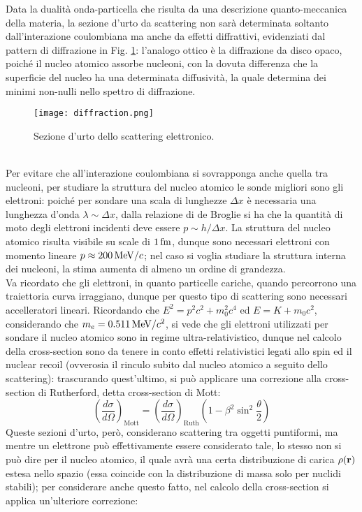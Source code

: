 Data la dualità onda-particella che risulta da una descrizione quanto-meccanica della materia, la sezione d'urto da scattering non sarà determinata soltanto dall'interazione coulombiana ma anche da effetti diffrattivi, evidenziati dal pattern di diffrazione in Fig. \ref{diffraction}: l'analogo ottico è la diffrazione da disco opaco, poiché il nucleo atomico assorbe nucleoni, con la dovuta differenza che la superficie del nucleo ha una determinata diffusività, la quale determina dei minimi non-nulli nello spettro di diffrazione.
\begin{figure}
	\centering
	\texttt{[image: diffraction.png]}
	\caption{Sezione d'urto dello scattering elettronico.}
	\label{diffraction}
\end{figure}\\
Per evitare che all'interazione coulombiana si sovrapponga anche quella tra nucleoni, per studiare la struttura del nucleo atomico le sonde migliori sono gli elettroni: poiché per sondare una scala di lunghezze $ \Delta x $ è necessaria una lunghezza d'onda $ \lambda \sim \Delta x $, dalla relazione di de Broglie si ha che la quantità di moto degli elettroni incidenti deve essere $ p \sim h / \Delta x $. La struttura del nucleo atomico risulta visibile su scale di $ 1\,\mathrm{fm} $, dunque sono necessari elettroni con momento lineare $ p \approx 200 \,\mathrm{MeV}/c $; nel caso si voglia studiare la struttura interna dei nucleoni, la stima aumenta di almeno un ordine di grandezza.\\
Va ricordato che gli elettroni, in quanto particelle cariche, quando percorrono una traiettoria curva irraggiano, dunque per questo tipo di scattering sono necessari accelleratori lineari.
Ricordando che $ E^2 = p^2 c^2 + m_0^2 c^4 $ ed $ E = K + m_0 c^2 $, considerando che $ m_e = 0.511 \,\mathrm{MeV}/c^2 $, si vede che gli elettroni utilizzati per sondare il nucleo atomico sono in regime ultra-relativistico, dunque nel calcolo della cross-section sono da tenere in conto effetti relativistici legati allo spin ed il nuclear recoil (ovverosia il rinculo subito dal nucleo atomico a seguito dello scattering): trascurando quest'ultimo, si può applicare una correzione alla cross-section di Rutherford, detta cross-section di Mott:
\begin{equation}
	\left(\frac{d\sigma}{d\Omega}\right)_{\text{Mott}} = \left(\frac{d\sigma}{d\Omega}\right)_{\text{Ruth}} \left(1 - \beta^2 \sin^2 \frac{\theta}{2}\right)
	\label{eq:11}
\end{equation}
Queste sezioni d'urto, però, considerano scattering tra oggetti puntiformi, ma mentre un elettrone può effettivamente essere considerato tale, lo stesso non si può dire per il nucleo atomico, il quale avrà una certa distribuzione di carica $ \rho(\mathbf{r}) $ estesa nello spazio (essa coincide con la distribuzione di massa solo per nuclidi stabili); per considerare anche questo fatto, nel calcolo della cross-section si applica un'ulteriore correzione:
